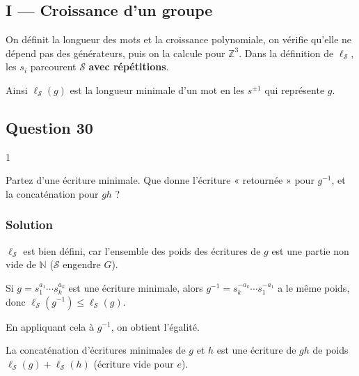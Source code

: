 \documentclass[11pt,a4paper]{article}
\newcommand{\equationajustee}[1]{%
  \sbox{\boiteequation}{$\displaystyle #1$}%
  \ifdim\wd\boiteequation>\linewidth
    \[\resizebox{\linewidth}{!}{\usebox{\boiteequation}}\]%
  \else
    \[#1\]%
  \fi}
\begin{document}
\hypertarget{i-croissance-dun-groupe}{%
\subsection{I --- Croissance d'un groupe}\label{i-croissance-dun-groupe}}

On définit la longueur des mots et la croissance polynomiale, on vérifie qu'elle ne dépend pas des générateurs, puis on la calcule pour \({\mathbb{Z}}^3\). Dans la définition de \(\ell_{\mathcal{S}}\), les \(s_i\) parcourent \(\mathcal{S}\) \textbf{avec répétitions}.

Ainsi \(\ell_{\mathcal{S}}(g)\) est la longueur minimale d'un mot en les \(s^{\pm1}\) qui représente \(g\).

\hypertarget{question-30}{%
\subsection{Question 30}\label{question-30}}

\begin{indication}{1}

Partez d'une écriture minimale. Que donne l'écriture « retournée » pour \(g^{-1}\), et la concaténation pour \(gh\) ?

\end{indication}

\hypertarget{solution-29}{%
\subsubsection{Solution}\label{solution-29}}

\(\ell_{\mathcal{S}}\) est bien défini, car l'ensemble des poids des écritures de \(g\) est une partie non vide de \(\mathbb{N}\) (\(\mathcal{S}\) engendre \(G\)).

Si \(g=s_1^{a_1}\cdots s_k^{a_k}\) est une écriture minimale, alors \(g^{-1}=s_k^{-a_k}\cdots s_1^{-a_1}\) a le même poids, donc \(\ell_{\mathcal{S}}(g^{-1})\leqslant\ell_{\mathcal{S}}(g)\).

En appliquant cela à \(g^{-1}\), on obtient l'égalité.

La concaténation d'écritures minimales de \(g\) et \(h\) est une écriture de \(gh\) de poids \(\ell_{\mathcal{S}}(g)+\ell_{\mathcal{S}}(h)\) (écriture vide pour \(e\)).

\equationajustee{\boxed{\begin{aligned}\ell_{\mathcal{S}}(g^{-1})&=\ell_{\mathcal{S}}(g),\\\ell_{\mathcal{S}}(gh)&\leqslant\ell_{\mathcal{S}}(g)+\ell_{\mathcal{S}}(h).\end{aligned}}}
\end{document}
